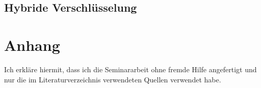 \documentclass[14pt,a4paper]{scrartcl}
\begin{document}
	

	 	
	\subsection{Hybride Verschlüsselung}

\pagebreak
\section{Anhang}

\listoffigures
\pagebreak

\nocite{*}
\printbibliography
\pagebreak

\begin{flushleft}
Ich erkläre hiermit, dass ich die Seminararbeit ohne fremde Hilfe angefertigt und nur die im Literaturverzeichnis verwendeten Quellen verwendet habe.
\end{flushleft}
\end{document}
